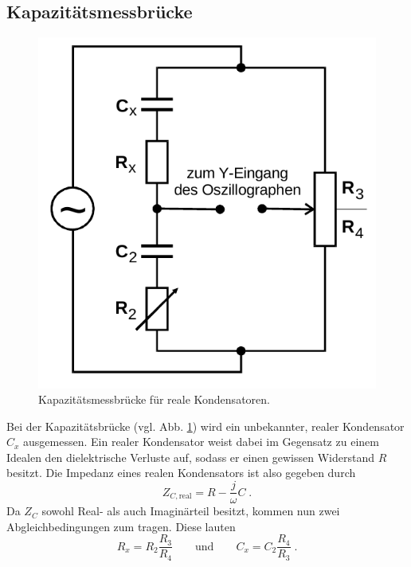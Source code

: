 \subsection{Kapazitätsmessbrücke}            
\label{sec:Cbrücke}
\begin{figure}[H]
    \centering
    \includegraphics[scale=0.4]{pictures/3-C.png}
    \caption{Kapazitätsmessbrücke für reale Kondensatoren. \cite{AP01}}
    \label{fig:Cbrücke}
\end{figure}
Bei der Kapazitätsbrücke (vgl. Abb. \ref{fig:Cbrücke}) wird ein unbekannter, realer Kondensator $C_x$ ausgemessen. Ein realer Kondensator 
weist dabei im Gegensatz zu einem Idealen den dielektrische Verluste auf, sodass er einen gewissen Widerstand $R$ besitzt. Die Impedanz 
eines realen Kondensators ist also gegeben durch 
\begin{equation}
    Z_{C,\text{real}}=R-\frac{j}{\omega}C \;.
\end{equation}
Da $Z_C$ sowohl Real- als auch Imaginärteil besitzt, kommen nun zwei Abgleichbedingungen zum tragen. Diese lauten 
\begin{equation}
    R_x=R_2\frac{R_3}{R_4} 
    \qquad\text{und}\qquad
    C_x=C_2\frac{R_4}{R_3} \;.
    \label{eqn:Cbrücke}
\end{equation}

